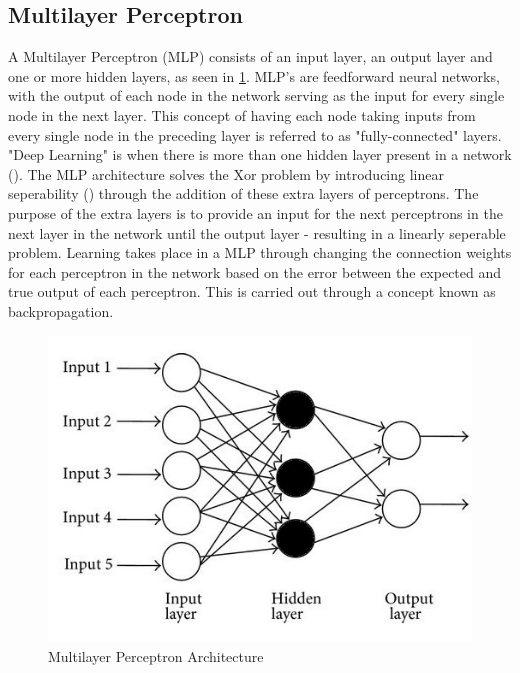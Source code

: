 \documentclass[12pt]{report}
\begin{document}
\subsection{Multilayer Perceptron}
\begin{flushleft}
A Multilayer Perceptron (MLP) consists of an input layer, an output layer and one or more hidden layers, as seen in \ref{fig:mlp}. MLP's are feedforward neural networks, with the output of each node in the network serving as the input for every single node in the next layer. This concept of having each node taking inputs from every single node in the preceding layer is referred to as "fully-connected" layers. "Deep Learning" is when there is more than one hidden layer present in a network (\cite{o2015introduction}). 
\linebreak
\linebreak
The MLP architecture solves the Xor problem by introducing linear seperability (\cite{Singh2016MinimumCM}) through the addition of these extra layers of perceptrons. The purpose of the extra layers is to provide an input for the next perceptrons in the next layer in the network until the output layer - resulting in a linearly seperable problem.
\linebreak
\linebreak
Learning takes place in a MLP through changing the connection weights for each perceptron in the network based on the error between the expected and true output of each perceptron. This is carried out through a concept known as backpropagation.
\end{flushleft}

\vspace{0.5cm}
\begin{figure}[ht!]
	\centering
	\includegraphics[width=12cm]{mlp}
	\caption{Multilayer Perceptron Architecture}
	\label{fig:mlp}
\end{figure}
\end{document}
